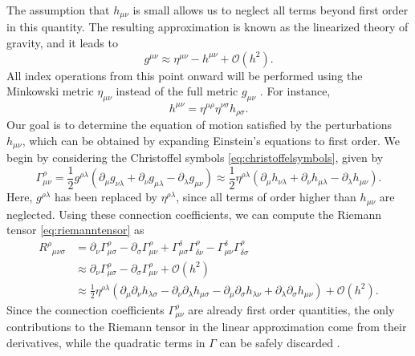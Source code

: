 The assumption that $h_{\mu\nu}$ is small allows us to neglect all terms beyond first order in this quantity. The resulting approximation is known as the linearized theory of gravity, and it leads to
\begin{equation}
    g^{\mu\nu} \approx \eta^{\mu\nu} - h^{\mu\nu} + \mathcal{O}(h^2).
\end{equation}
All index operations from this point onward will be performed using the Minkowski metric $\eta_{\mu\nu}$ instead of the full metric $g_{\mu\nu}$ \cite{llibrecarroll2004lectures}. For instance,
\begin{equation}
    h^{\mu\nu} = \eta^{\mu\rho} \eta^{\nu\sigma} h_{\rho\sigma}.
\end{equation}
Our goal is to determine the equation of motion satisfied by the perturbations $h_{\mu\nu}$, which can be obtained by expanding Einstein’s equations to first order. We begin by considering the Christoffel symbols \eqref{eq:christoffelsymbols}, given by
\begin{equation}
    \Gamma^\rho_{\mu\nu} = \frac{1}{2} g^{\rho\lambda}
    \left( \partial_\mu g_{\nu\lambda} + \partial_\nu g_{\mu\lambda} - \partial_\lambda g_{\mu\nu} \right)
    \approx \frac{1}{2} \eta^{\rho\lambda}
    \left( \partial_\mu h_{\nu\lambda} + \partial_\nu h_{\mu\lambda} - \partial_\lambda h_{\mu\nu} \right).
\end{equation}
Here, $g^{\rho\lambda}$ has been replaced by $\eta^{\rho\lambda}$, since all terms of order higher than $h_{\mu\nu}$ are neglected. Using these connection coefficients, we can compute the Riemann tensor \eqref{eq:riemanntensor} as
\begin{equation}
\begin{aligned}
R^{\rho}{}_{\mu \nu \sigma}
&= \partial_\nu \Gamma^{\rho}_{\mu \sigma}
- \partial_\sigma \Gamma^{\rho}_{\mu \nu}
+ \Gamma^{\delta}_{\mu \sigma} \Gamma^{\rho}_{\delta \nu}
- \Gamma^{\delta}_{\mu \nu} \Gamma^{\rho}_{\delta \sigma} \\
&\approx \partial_\nu \Gamma^{\rho}_{\mu \sigma}
- \partial_\sigma \Gamma^{\rho}_{\mu \nu} + \mathcal{O}(h^2) \\
&\approx \frac{1}{2}\eta^{\rho\lambda}
\left( 
\partial_\mu \partial_\nu h_{\lambda \sigma}
- \partial_\nu \partial_\lambda h_{\mu \sigma}
- \partial_\mu \partial_\sigma h_{\lambda \nu}
+ \partial_\lambda \partial_\sigma h_{\mu \nu}
\right) + \mathcal{O}(h^2).
\end{aligned}
\end{equation}
Since the connection coefficients $\Gamma^{\rho}_{\mu\nu}$ are already first order quantities, the only contributions to the Riemann tensor in the linear approximation come from their derivatives, while the quadratic terms in $\Gamma$ can be safely discarded \cite{llibrecarroll2004lectures}.

